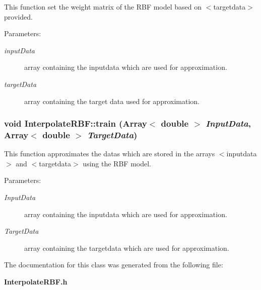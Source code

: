 This function set the weight matrix of the RBF model based on $<$targetdata$>$ provided. 

\begin{Desc}
\item[Parameters:]
\begin{description}
\item[{\em input\-Data}]array containing the inputdata which are used for approximation. \item[{\em target\-Data}]array containing the target data used for approximation.\end{description}
\end{Desc}
\subsubsection{\setlength{\rightskip}{0pt plus 5cm}void Interpolate\-RBF::train (Array$<$ double $>$ {\em Input\-Data}, Array$<$ double $>$ {\em Target\-Data})}\label{classInterpolateRBF_a8}


This function approximates the datas which are stored in the arrays $<$inputdata$>$ and $<$targetdata$>$ using the RBF model. 

\begin{Desc}
\item[Parameters:]
\begin{description}
\item[{\em Input\-Data}]array containing the inputdata which are used for approximation. \item[{\em Target\-Data}]array containing the targetdata which are used for approximation.\end{description}
\end{Desc}


The documentation for this class was generated from the following file:\begin{CompactItemize}
\item 
{\bf Interpolate\-RBF.h}\end{CompactItemize}
